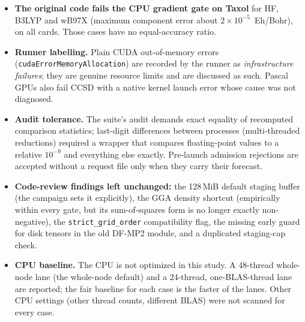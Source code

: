\begin{itemize}[leftmargin=*,itemsep=2pt]
\item \textbf{The original code fails the CPU gradient gate on Taxol} for HF, B3LYP and wB97X (maximum component error about $2\times10^{-5}$~Eh/Bohr), on all cards. Those cases have no equal-accuracy ratio.
\item \textbf{Runner labelling.} Plain CUDA out-of-memory errors (\texttt{cudaErrorMemoryAllocation}) are recorded by the runner as \emph{infrastructure failures}; they are genuine resource limits and are discussed as such. Pascal GPUs also fail CCSD with a native kernel launch error whose cause was not diagnosed.
\item \textbf{Audit tolerance.} The suite's audit demands exact equality of recomputed comparison statistics; last-digit differences between processes (multi-threaded reductions) required a wrapper that compares floating-point values to a relative $10^{-9}$ and everything else exactly. Pre-launch admission rejections are accepted without a request file only when they carry their forecast.
\item \textbf{Code-review findings left unchanged:} the 128\,MiB default staging buffer (the campaign sets it explicitly), the GGA density shortcut (empirically within every gate, but its sum-of-squares form is no longer exactly non-negative), the \texttt{strict\_grid\_order} compatibility flag, the missing early guard for disk tensors in the old DF-MP2 module, and a duplicated staging-cap check.
\item \textbf{CPU baseline.} The CPU is not optimized in this study. A 48-thread whole-node lane (the whole-node default) and a 24-thread, one-BLAS-thread lane are reported; the fair baseline for each case is the faster of the lanes. Other CPU settings (other thread counts, different BLAS) were not scanned for every case.
\end{itemize}
